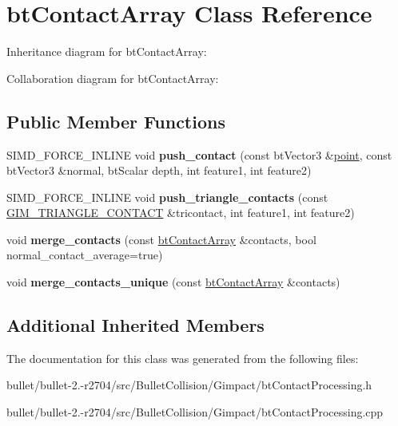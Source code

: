 \hypertarget{classbt_contact_array}{\section{bt\+Contact\+Array Class Reference}
\label{classbt_contact_array}
}


Inheritance diagram for bt\+Contact\+Array\+:


Collaboration diagram for bt\+Contact\+Array\+:
\subsection*{Public Member Functions}
\begin{DoxyCompactItemize}
\item 
\hypertarget{classbt_contact_array_a5ced019981636316b93fef70db421451}{S\+I\+M\+D\+\_\+\+F\+O\+R\+C\+E\+\_\+\+I\+N\+L\+I\+N\+E void {\bfseries push\+\_\+contact} (const bt\+Vector3 \&\hyperlink{structpoint}{point}, const bt\+Vector3 \&normal, bt\+Scalar depth, int feature1, int feature2)}\label{classbt_contact_array_a5ced019981636316b93fef70db421451}

\item 
\hypertarget{classbt_contact_array_a0ea62ec8f119f5d4f53e7e948c91c08a}{S\+I\+M\+D\+\_\+\+F\+O\+R\+C\+E\+\_\+\+I\+N\+L\+I\+N\+E void {\bfseries push\+\_\+triangle\+\_\+contacts} (const \hyperlink{struct_g_i_m___t_r_i_a_n_g_l_e___c_o_n_t_a_c_t}{G\+I\+M\+\_\+\+T\+R\+I\+A\+N\+G\+L\+E\+\_\+\+C\+O\+N\+T\+A\+C\+T} \&tricontact, int feature1, int feature2)}\label{classbt_contact_array_a0ea62ec8f119f5d4f53e7e948c91c08a}

\item 
\hypertarget{classbt_contact_array_aa05f154d28c59b3885445031b44b1e18}{void {\bfseries merge\+\_\+contacts} (const \hyperlink{classbt_contact_array}{bt\+Contact\+Array} \&contacts, bool normal\+\_\+contact\+\_\+average=true)}\label{classbt_contact_array_aa05f154d28c59b3885445031b44b1e18}

\item 
\hypertarget{classbt_contact_array_a8eba4c3e9f8fef58c39f168635280afc}{void {\bfseries merge\+\_\+contacts\+\_\+unique} (const \hyperlink{classbt_contact_array}{bt\+Contact\+Array} \&contacts)}\label{classbt_contact_array_a8eba4c3e9f8fef58c39f168635280afc}

\end{DoxyCompactItemize}
\subsection*{Additional Inherited Members}


The documentation for this class was generated from the following files\+:\begin{DoxyCompactItemize}
\item 
bullet/bullet-\/2.-\/r2704/src/\+Bullet\+Collision/\+Gimpact/bt\+Contact\+Processing.\+h\item 
bullet/bullet-\/2.-\/r2704/src/\+Bullet\+Collision/\+Gimpact/bt\+Contact\+Processing.\+cpp\end{DoxyCompactItemize}
